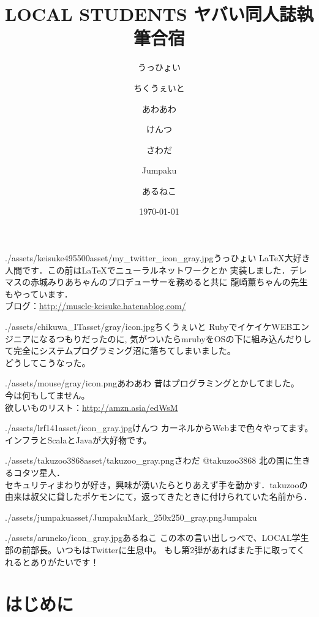 \documentclass[autodetect-engine,dvipdfmx-if-dvi,ja=standard,a5paper,10.5pt,twoside,openany,layout=v2]{bxjsbook}
\title{LOCAL STUDENTS ヤバい同人誌執筆合宿}
\author{うっひょい \and ちくうぇいと \and あわあわ \and けんつ \and さわだ \and Jumpaku \and あるねこ}
\date{\today}
\newcommand{\articlepath}{./articles}
\newcommand{\assetspath}{./assets}
\newcommand{\jumpakuasset}{\assetspath/jumpakuasset}
\newcommand{\takuzooasset}{\assetspath/takuzoo3868asset}
\newcommand{\lrfasset}{\assetspath/lrf141asset}
\newcommand{\materialofmouseasset}{\assetspath/mouse/gray}
\newcommand{\keisukeasset}{\assetspath/keisuke495500asset}
\newcommand{\chikuwaitasset}{\assetspath/chikuwa_ITasset/gray}
\begin{document}
\frontmatter
\maketitle
\begin{myintroduce}{\keisukeasset/my_twitter_icon_gray.jpg}{うっひょい}
  \LaTeX 大好き人間です．この前は\LaTeX でニューラルネットワークとか
  実装しました．デレマスの赤城みりあちゃんのプロデューサーを務めると共に
  龍崎薫ちゃんの先生もやっています．\\
  ブログ：\url{http://muscle-keisuke.hatenablog.com/}
\end{myintroduce}
\begin{myintroduce}{\chikuwaitasset/icon.jpg}{ちくうぇいと}
  RubyでイケイケWEBエンジニアになるつもりだったのに, 気がついたらmrubyをOSの下に組み込んだりして完全にシステムプログラミング沼に落ちてしまいました。\\
  どうしてこうなった。
\end{myintroduce}
\begin{myintroduce}{\materialofmouseasset/icon.png}{あわあわ}
  昔はプログラミングとかしてました。\\
  今は何もしてません。\\
  欲しいものリスト：\url{http://amzn.asia/edWsM}
\end{myintroduce}
\begin{myintroduce}{\lrfasset/icon_gray.jpg}{けんつ}
  カーネルからWebまで色々やってます。\\
  インフラとScalaとJavaが大好物です。
\end{myintroduce}
\begin{myintroduce}{\takuzooasset/takuzoo_gray.png}{さわだ @takuzoo3868}
  北の国に生きるコタツ星人．\\
  セキュリティまわりが好き，興味が湧いたらとりあえず手を動かす．takuzooの由来は叔父に貸したポケモンにて，返ってきたときに付けられていた名前から．
\end{myintroduce}
\begin{myintroduce}{\jumpakuasset/JumpakuMark_250x250_gray.png}{Jumpaku}

\end{myintroduce}

\begin{myintroduce}{./assets/aruneko/icon_gray.jpg}{あるねこ}
  この本の言い出しっぺで、LOCAL学生部の前部長。いつもはTwitterに生息中。
  もし第2弾があればまた手に取ってくれるとありがたいです！
\end{myintroduce}

\chapter{はじめに}

\end{document}
